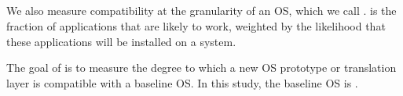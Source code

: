 \subsection{\CompatMetric{}}

We also measure compatibility at the granularity of an OS,
which we call \compatmetric{}.
\Compatmetric{} is the fraction of applications that are likely to work,
weighted by the likelihood that these applications will be installed on a system.

The goal of \compatmetric{} is to measure the degree to which a
new OS prototype or translation layer is compatible with a baseline OS.
In this study, the baseline OS is \osdist{}.




